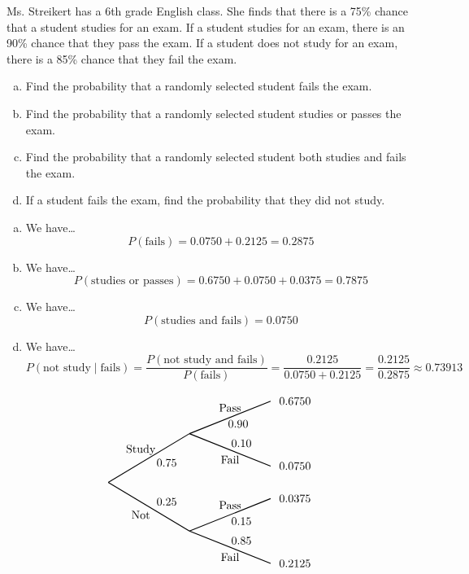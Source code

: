 \documentclass[11pt,letterpaper]{article}
\begin{document}
\newpage



 Ms. Streikert has a 6th grade English class. She finds that there is a 75\% chance that a student studies for an exam. If a student studies for an exam, there is an 90\% chance that they pass the exam. If a student does not study for an exam, there is a 85\% chance that they fail the exam. 
	\begin{enumerate}[(a)]
	\item Find the probability that a randomly selected student fails the exam.
	\item Find the probability that a randomly selected student studies or passes the exam.
	\item Find the probability that a randomly selected student both studies and fails the exam.
	\item If a student fails the exam, find the probability that they did not study. 
	\end{enumerate} \pspace

\sol 
\begin{enumerate}[(a)]
\item We have\dots
	\[
	P(\text{fails})= 0.0750 + 0.2125= 0.2875
	\] \pspace

\item We have\dots
	\[
	P(\text{studies or passes})= 0.6750 + 0.0750 + 0.0375= 0.7875
	\] \pspace 

\item We have\dots
	\[
	P(\text{studies and fails})= 0.0750 
	\] \pspace
  
\item We have\dots
	\[
	P(\text{not study} \;|\; \text{fails})= \dfrac{P(\text{not study and fails})}{P(\text{fails})}= \dfrac{0.2125}{0.0750 + 0.2125}= \dfrac{0.2125}{0.2875} \approx 0.73913
	\]   
\end{enumerate} \vfill

		\[
		\begin{tikzpicture}[scale= 1.0]
		\def\FirstUpLabel{Study}
		\def\FirstDownLabel{Not}
		\def\SecondUpLabel{Pass}
		\def\SecondDownLabel{Fail}
		\def\Up{$0.75$}
		\def\Down{$0.25$}
		\def\UpUp{$0.90$}
		\def\UpDown{$0.10$}
		\def\DownUp{$0.15$}
		\def\DownDown{$0.85$}
		\def\first{$0.6750$}
		\def\second{$0.0750$}
		\def\third{$0.0375$}
		\def\fourth{$0.2125$}
		
		\node at (1,1) {\FirstUpLabel};	
		\node at (1,-1) {\FirstDownLabel};	
		\node at (1.8,0.6) {\Up};
		\node at (1.8,-0.6) {\Down};
		\draw[thick] (0,0) -- (2.5,1.5);
		\draw[thick] (0,0) -- (2.5,-1.5);
		
		\node at (3.75,2.3) {\SecondUpLabel};
		\node at (3.75,0.7) {\SecondDownLabel};
		\node at (4,1.8) {\UpUp};
		\node at (4.1,1.2) {\UpDown};
		\node at (5.75,2.5) {\first};
		\node at (5.75,0.5) {\second};
		\draw[thick] (2.5,1.5) -- (5,2.5);
		\draw[thick] (2.5,1.5) -- (5,0.5);

		\node at (3.75,-0.7) {\SecondUpLabel};
		\node at (3.75,-2.3) {\SecondDownLabel};
		\node at (4.1,-1.2) {\DownUp};
		\node at (4.1,-1.8) {\DownDown};
		\node at (5.75,-0.5) {\third};	
		\node at (5.75,-2.5) {\fourth};	
		\draw[thick] (2.5,-1.5) -- (5,-0.5);
		\draw[thick] (2.5,-1.5) -- (5,-2.5);
		\end{tikzpicture}
		\]
\end{document}
